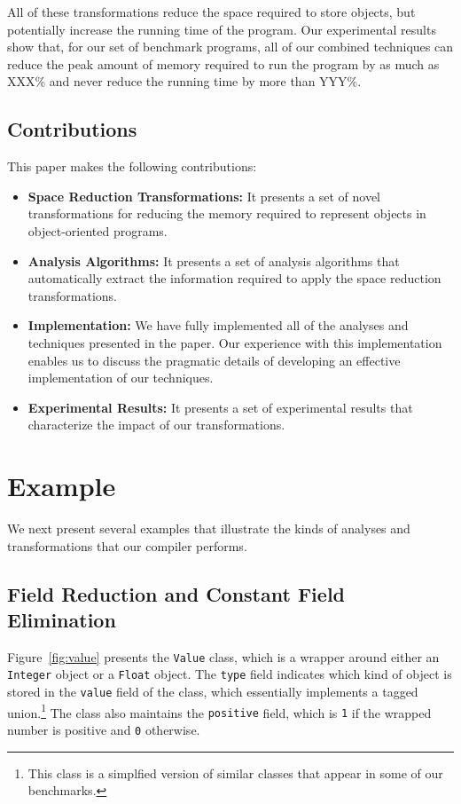 \documentclass[preprint]{acmconf}
\begin{document}
All of these transformations reduce the space required to store
objects, but potentially increase the running time of the program.
Our experimental results show that, for our set of benchmark
programs, all of our combined techniques can reduce the peak amount of memory
required to run the program by as much as XXX\% and never reduce the
running time by more than YYY\%.

\subsection{Contributions}

This paper makes the following contributions:
\begin{itemize}
\item {\bf Space Reduction Transformations:} It presents a set
of novel transformations for reducing the memory required to 
represent objects in object-oriented programs.

\item {\bf Analysis Algorithms:} It presents a set of 
analysis algorithms that automatically extract the 
information required to apply the space reduction 
transformations.

\item {\bf Implementation:} We have fully 
implemented all of the analyses and techniques 
presented in the paper. Our experience with this
implementation enables us to discuss the pragmatic
details of developing an effective implementation 
of our techniques. 

\item {\bf Experimental Results:} It presents a set
of experimental results that characterize the impact
of our transformations. 
\end{itemize}

\section{Example}

We next present several examples that illustrate the kinds of 
analyses and transformations that our compiler performs.

\subsection{Field Reduction and Constant Field Elimination}

Figure~\ref{fig:value} presents the {\tt Value} class, which is 
a wrapper around either an {\tt Integer} object or a {\tt Float}
object. The {\tt type} field indicates which kind of object
is stored in the {\tt value} field of the class, 
which essentially implements a tagged 
union.\footnote{This class is a simplfied version of similar
classes that appear in some of our benchmarks.} 
The class also maintains the {\tt positive} field, which is
{\tt 1} if the wrapped number is positive and {\tt 0} otherwise. 
\end{document}
